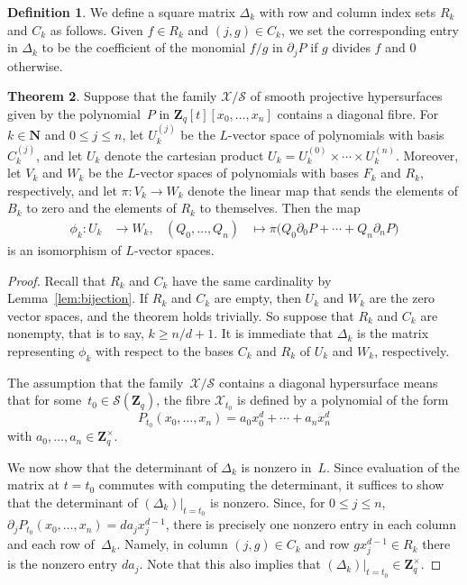 \documentclass[a4paper,11pt]{article}
\numberwithin{equation}{section}
\newcommand{\NN}{\mathbf{N}} %
\newcommand{\ZZ}{\mathbf{Z}} %
\renewcommand{\to}{\rightarrow}        %
\theoremstyle{definition}
\newtheorem{thm}{Theorem}[section]
\newtheorem{defn}[thm]{Definition}
\begin{document}
\begin{defn} \label{defn:Deltak}
We define a square matrix $\Delta_k$ with 
row and column index sets $R_k$ and $C_k$ as follows.  
Given $f \in R_k$ and $(j,g) \in C_k$, we set the corresponding entry in 
$\Delta_k$ to be the coefficient of the monomial $f/g$ in $\partial_j P$ if 
$g$ divides $f$ and $0$ otherwise.
\end{defn}

\begin{thm} \label{thm:Isomorphism}
Suppose that the family $\mathcal{X}/\mathcal{S}$ of smooth projective
hypersurfaces given by the polynomial~$P$ in $\ZZ_q[t][x_0, \dotsc, x_n]$ contains 
a diagonal fibre.  For $k \in \NN$ and $0 \leq j \leq n$, let $U_k^{(j)}$ be 
the $L$-vector space of polynomials with basis $C_k^{(j)}$, and let $U_k$ 
denote the cartesian product $U_k = U_k^{(0)} \times \dotsb \times U_k^{(n)}$. 
Moreover, let $V_k$ and $W_k$ be the $L$-vector spaces of polynomials with 
bases $F_k$ and $R_k$, respectively, and let $\pi \colon V_k \rightarrow W_k$ 
denote the linear map that sends the elements of $B_k$ to zero and the 
elements of $R_k$ to themselves. %
Then the map 
\begin{align}
\phi_k \colon U_k &\to W_k,
&(Q_0, \dotsc, Q_n) &\mapsto \pi \bigl( Q_0 \partial_0 P + \dotsb + Q_n \partial_n P \bigr)
\end{align}
is an isomorphism of $L$-vector spaces.
\end{thm}

\begin{proof}
Recall that $R_k$ and $C_k$ have the same cardinality by Lemma~\ref{lem:bijection}.
If $R_k$ and $C_k$ are empty, then $U_k$ and $W_k$ are the zero vector spaces, 
and the theorem holds trivially. So suppose that $R_k$ and $C_k$ are nonempty, 
that is to say, $k \geq n/d + 1$. It is immediate that $\Delta_k$ is the matrix 
representing $\phi_k$ with respect to the bases $C_k$ and $R_k$ of $U_k$ and $W_k$, 
respectively.

The assumption that the family~$\mathcal{X}/\mathcal{S}$ contains a diagonal 
hypersurface means that for some~$t_0 \in \mathcal{S}(\ZZ_q)$, 
the fibre $\mathcal{X}_{t_0}$ is defined by a polynomial of the form 
\begin{equation*}
P_{t_0}(x_0, \dotsc, x_n) = a_0 x_0^d + \dotsb + a_n x_n^d
\end{equation*}
with $a_0, \dotsc, a_n \in \ZZ_q^{\times}$.

We now show that the determinant of $\Delta_k$ is nonzero in~$L$.  Since 
evaluation of the matrix at \mbox{$t = t_0$} commutes with computing the 
determinant, it suffices to show that the determinant of 
$(\Delta_k) \big |_{t=t_0}$ is nonzero.  Since, for $0 \leq j \leq n$, 
$\partial_j P_{t_0} (x_0, \dotsc, x_n) = d a_j x_j^{d-1}$, there is 
precisely one nonzero entry in each column and each row of~$\Delta_k$.  
Namely, in column $(j, g) \in C_k$ and row $g x_j^{d-1} \in R_k$ there is 
the nonzero entry $d a_j$. Note that this also implies that 
$(\Delta_k) \big |_{t=t_0} \in \ZZ_{q}^{\times}$.
\end{proof}
\end{document}
